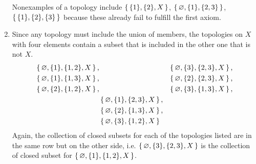 \begin{example}
\begin{enumerate}
        Nonexamples of a topology include \(\left\{\, \{1\}, \{2\}, X \,\right\}\), \(\left\{\, \varnothing, \{1\}, \{2, 3\} \,\right\}\), \(\left\{\, \{1\}, \{2\}, \{3\} \,\right\}\) because these already fail to fulfill the first axiom.
        \item Since any topology must include the union of members, the topologies on \(X\) with four elements contain a subset that is included in the other one that is not \(X\).
        \begin{align*}
            \left\{\, \varnothing, \{1\}, \{1, 2\}, X \,\right\} \text{,} & & \left\{\, \varnothing, \{3\}, \{2, 3\}, X \,\right\} \text{,} \\
            \left\{\, \varnothing, \{1\}, \{1, 3\}, X \,\right\} \text{,} & & \left\{\, \varnothing, \{2\}, \{2, 3\}, X \,\right\} \text{,} \\
            \left\{\, \varnothing, \{2\}, \{1, 2\}, X \,\right\} \text{,} & & \left\{\, \varnothing, \{3\}, \{1, 3\}, X \,\right\} \text{,}\\
            & \left\{\, \varnothing, \{1\}, \{2, 3\}, X \,\right\} \text{,} & \\
            & \left\{\, \varnothing, \{2\}, \{1, 3\}, X \,\right\} \text{,} & \\
            & \left\{\, \varnothing, \{3\}, \{1, 2\}, X \,\right\} &
        \end{align*}
        Again, the collection of closed subsets for each of the topologies listed are in the same row but on the other side, i.e. \(\left\{\, \varnothing, \{3\}, \{2, 3\}, X \,\right\}\) is the collection of closed subset for \(\left\{\, \varnothing, \{1\}, \{1, 2\}, X \,\right\}\).


\end{enumerate}
\end{example}
